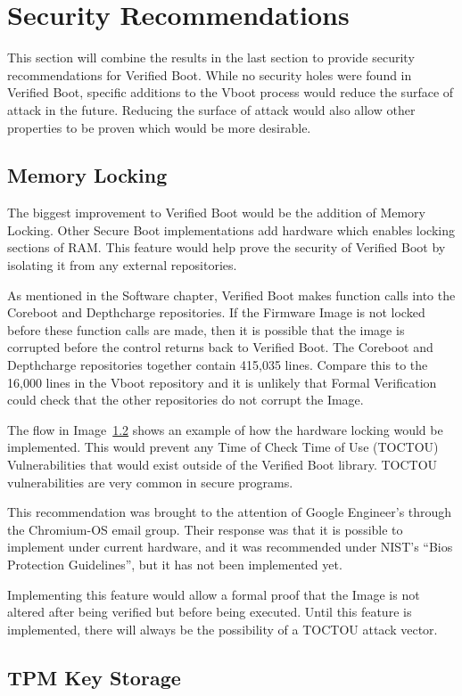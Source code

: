 \documentclass[../report.tex]{subfiles}
\begin{document}
\onehalfspacing
\newpage

\section{Security Recommendations}

This section will combine the results in the last section to provide security
recommendations for Verified Boot.
While no security holes were found in Verified Boot, specific additions to the
Vboot process would reduce the surface of attack in the future.
Reducing the surface of attack would also allow other properties to be proven
which would be more desirable.

\subsection{Memory Locking}

The biggest improvement to Verified Boot would be the addition of Memory
Locking.
Other Secure Boot implementations add hardware which enables locking sections
of RAM\cite{elane}.
This feature would help prove the security of Verified Boot by isolating it from
any external repositories.

As mentioned in the Software chapter, Verified Boot makes function calls into
the Coreboot and Depthcharge repositories.
If the Firmware Image is not locked before these function calls are made, then
it is possible that the image is corrupted before the control returns back to
Verified Boot.
The Coreboot and Depthcharge repositories together contain 415,035 lines. 
Compare this to the 16,000 lines in the Vboot repository and it is unlikely that
Formal Verification could check that the other repositories do not corrupt the
Image.


The flow in Image~\ref{} shows an example of how the hardware locking would be
implemented.
This would prevent any Time of Check Time of Use (TOCTOU) Vulnerabilities that
would exist outside of the Verified Boot library.
TOCTOU vulnerabilities are very common in secure programs\cite{tpm-toctou}.

This recommendation was brought to the attention of Google Engineer's through
the Chromium-OS email group.
Their response was that it is possible to implement under current hardware, and
it was recommended under NIST's ``Bios Protection Guidelines'', but it has not
been implemented yet.

Implementing this feature would allow a formal proof that the Image is not
altered after being verified but before being executed. 
Until this feature is implemented, there will always be the possibility of a
TOCTOU attack vector.

\subsection{TPM Key Storage}

\end{document}
